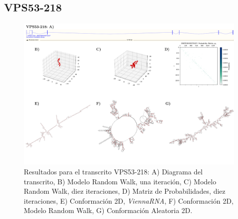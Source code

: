 \documentclass[a4paper,11pt,titlepage]{article}
\theoremstyle{definition}
\begin{document}
\subsection*{VPS53-218}\label{subsec:gene3}

\begin{figure}[H]
    \centering
    \includegraphics[width=\textwidth]{images/VPS53-218_full.png}
    \small{\caption{Resultados para el transcrito VPS53-218: A) Diagrama del transcrito, B) Modelo Random Walk, una iteración, C) Modelo Random Walk, diez iteraciones, D) Matriz de Probabilidades, diez iteraciones, E) Conformación 2D, \textit{ViennaRNA}, F) Conformación 2D, Modelo Random Walk, G) Conformación Aleatoria 2D.}\label{fig:VPS53-218-diag}}\normalsize
\end{figure}
\end{document}
